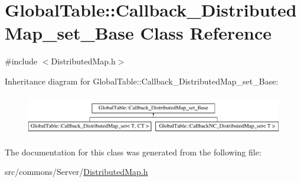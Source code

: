 \hypertarget{class_global_table_1_1_callback___distributed_map__set___base}{
\section{GlobalTable::Callback\_\-DistributedMap\_\-set\_\-Base Class Reference}
\label{class_global_table_1_1_callback___distributed_map__set___base}
}


{\ttfamily \#include $<$DistributedMap.h$>$}

Inheritance diagram for GlobalTable::Callback\_\-DistributedMap\_\-set\_\-Base:\begin{figure}[H]
\begin{center}
\leavevmode
\includegraphics[height=1.78914cm]{class_global_table_1_1_callback___distributed_map__set___base}
\end{center}
\end{figure}


The documentation for this class was generated from the following file:\begin{DoxyCompactItemize}
\item 
src/commons/Server/\hyperlink{_distributed_map_8h}{DistributedMap.h}\end{DoxyCompactItemize}

